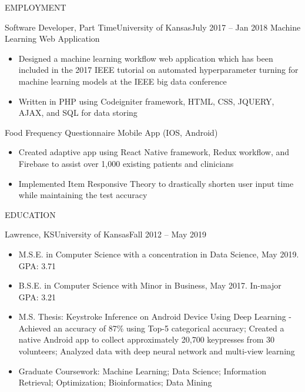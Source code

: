 \documentclass[]{mcdowellcv}
\begin{document}
\begin{cvsection}{EMPLOYMENT}
		\begin{cvsubsection}{Software Developer, Part Time}{University of Kansas}{July 2017 -- Jan 2018}		
			Machine Learning Web Application
			\begin{itemize}
				\item Designed a machine learning workflow web application which has been included in the 2017 IEEE tutorial on automated hyperparameter turning for machine learning models at the IEEE big data conference
				\item Written in PHP using Codeigniter framework, HTML, CSS, JQUERY, AJAX, and SQL for data storing
			\end{itemize}
			Food Frequency Questionnaire Mobile App (IOS, Android)
			\begin{itemize}
				\item Created adaptive app using React Native framework, Redux workflow, and Firebase to assist over 1,000 existing patients and clinicians
				\item Implemented Item Responsive Theory to drastically shorten user input time while maintaining the test accuracy
			\end{itemize}
		\end{cvsubsection}
	\end{cvsection}
	
	\begin{cvsection}{EDUCATION}
		\begin{cvsubsection}{Lawrence, KS}{University of Kansas}{Fall 2012 -- May 2019}
			\begin{itemize}
				\item M.S.E. in Computer Science with a concentration in Data Science, May 2019. GPA: 3.71
				\item B.S.E. in Computer Science with Minor in Business, May 2017. In-major GPA: 3.21
				\item M.S. Thesis: Keystroke Inference on Android Device Using Deep Learning - Achieved an accuracy of 87\% using Top-5 categorical accuracy; Created a native Android app to collect approximately 20,700 keypresses from 30 volunteers; Analyzed data with deep neural network and multi-view learning 				
				\item Graduate Coursework: Machine Learning; Data Science; Information Retrieval; Optimization; Bioinformatics; Data Mining
			\end{itemize}
		\end{cvsubsection}
	\end{cvsection}
	
\end{document}
